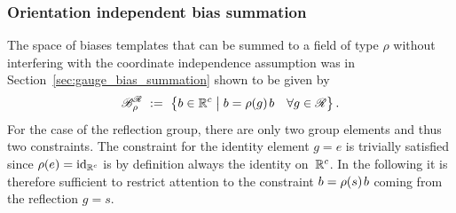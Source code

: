 \subsubsection{Orientation independent bias summation}
\label{sec:mobius_bias}

The space of biases templates that can be summed to a field of type $\rho$ without interfering with the coordinate independence assumption was in Section~\ref{sec:gauge_bias_summation} shown to be given by
\begin{align}
    \mathscr{B}^{\mathscr{R}}_\rho\ :=\ \big\{ b \in\mathbb{R}^c \;\big|\; b = \rho(g)\mkern2mu b\ \ \ \forall g\in \mathscr{R} \big\} \,.
\end{align}
For the case of the reflection group, there are only two group elements and thus two constraints.
The constraint for the identity element $g=e$ is trivially satisfied since $\rho(e) = \mathrm{id}_{\mathbb{R}^c}$ is by definition always the identity on~$\mathbb{R}^c$.
In the following it is therefore sufficient to restrict attention to the constraint $b = \rho(s)\mkern2mu b$ coming from the reflection $g=s$.

